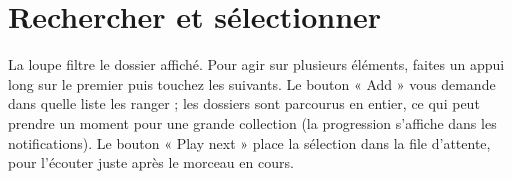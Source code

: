 \section{Rechercher et sélectionner}
La loupe filtre le dossier affiché. Pour agir sur plusieurs éléments, faites un appui long sur le premier puis
touchez les suivants. Le bouton « Add » vous demande dans quelle liste les ranger ; les dossiers sont parcourus en
entier, ce qui peut prendre un moment pour une grande collection (la progression s'affiche dans les notifications).
Le bouton « Play next » place la sélection dans la file d'attente, pour l'écouter juste après le morceau en cours.
